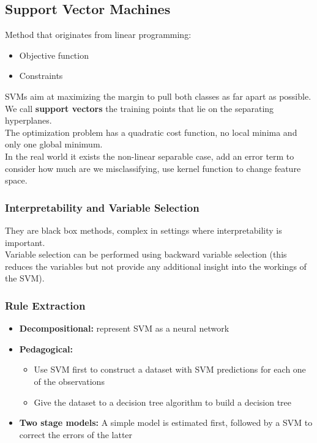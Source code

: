     \subsection{Support Vector Machines}
        Method that originates from linear programming:
        \begin{itemize}
            \item Objective function 
            \item Constraints 
        \end{itemize}
        SVMs aim at maximizing the margin to pull both classes as far apart as possible.\\
        We call \textbf{support vectors} the training points that lie on the separating hyperplanes.\\
        The optimization problem has a quadratic cost function, no local minima and only one global minimum.\\
        In the real world it exists the non-linear separable case, add an error term to consider how much are we misclassifying, use kernel function to change feature space.
        \subsubsection{Interpretability and Variable Selection}
            They are black box methods, complex in settings where interpretability is important.\\
            Variable selection can be performed using backward variable selection (this reduces the variables but not provide any additional insight into the workings of the SVM).
        \subsubsection{Rule Extraction}
            \begin{itemize}
                \item \textbf{Decompositional:} represent SVM as a neural network
                \item \textbf{Pedagogical:} 
                \begin{itemize}
                    \item Use SVM first to construct a dataset with SVM predictions for each one of the observations
                    \item Give the dataset to a decision tree algorithm to build a decision tree
                \end{itemize}
                \item \textbf{Two stage models:} A simple model is estimated first, followed by a SVM to correct the errors of the latter
            \end{itemize}

